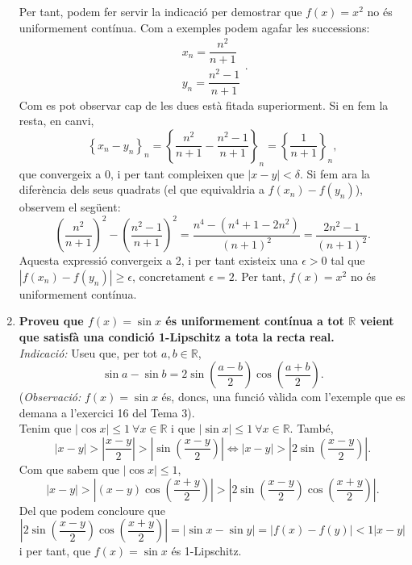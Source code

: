 \documentclass[11pt]{article}
\begin{document}
\begin{enumerate}
$$	$$
	Per tant, podem fer servir la indicació per demostrar que $f(x)=x^2$ no és uniformement contínua. Com a exemples podem agafar les successions:
	$$\begin{array}{lll}
	x_n=\dfrac{n^2}{n+1}\\
	y_n=\dfrac{n^2-1}{n+1}
	\end{array}.
	$$
	Com es pot observar cap de les dues està fitada superiorment. Si en fem la resta, en canvi,
	$$
	\left\{x_n-y_n\right\}_n=\left\{\dfrac{n^2}{n+1}-\dfrac{n^2-1}{n+1}\right\}_n=\left\{\dfrac{1}{n+1}\right\}_n,
	$$
	que convergeix a 0, i per tant compleixen que $|x-y|<\delta$. Si fem ara la diferència dels seus quadrats (el que equivaldria a $f(x_n)-f(y_n)$), observem el següent:
	$$
	\left(\dfrac{n^2}{n+1}\right)^2-\left(\dfrac{n^2-1}{n+1}\right)^2=\dfrac{n^4-(n^4+1-2n^2)}{(n+1)^2}=\dfrac{2n^2-1}{(n+1)^2}.
	$$
	Aquesta expressió convergeix a 2, i per tant existeix una $\epsilon>0$ tal que $|f(x_n)-f(y_n)|\geq\epsilon$, concretament $\epsilon=2$. Per tant, $f(x)=x^2$ no és uniformement contínua.
	\item \textbf{Proveu que $f(x)=\sin x$ és uniformement contínua a tot $\mathbb{R}$ veient que satisfà una condició 1-Lipschitz a tota la recta real.}\\
	\textit{Indicació:} Useu que, per tot $a,b\in\mathbb{R}$,
	$$\sin{a}-\sin{b}=2\sin{\left(\dfrac{a-b}{2}\right)}\cos{\left(\dfrac{a+b}{2}\right)}.$$
	(\textit{Observació:} $f(x)=\sin{x}$ és, doncs, una funció vàlida com l'exemple que es demana a l'exercici 16 del Tema 3).\\
	Tenim que $|\cos{x}|\leq 1\ \forall x\in\mathbb{R}$ i que $|\sin{x}|\leq 1\ \forall x\in\mathbb{R}$. També,
	$$
	|x-y|>\left|\dfrac{x-y}{2}\right|>\left|\sin\left(\dfrac{x-y}{2}\right)\right|\iff |x-y|>\left|2\sin\left(\dfrac{x-y}{2}\right)\right|.
	$$
	Com que sabem que $|\cos{x}|\leq 1$,
	$$
	|x-y|>\left|(x-y)\cos{\left(\dfrac{x+y}{2}\right)}\right|>\left|2\sin{\left(\dfrac{x-y}{2}\right)}\cos{\left(\dfrac{x+y}{2}\right)}\right|.
	$$
	Del que podem concloure que
	$$
	\left|2\sin{\left(\dfrac{x-y}{2}\right)}\cos{\left(\dfrac{x+y}{2}\right)}\right|=|\sin{x}-\sin{y}|=|f(x)-f(y)|<1|x-y|
	$$
	i per tant, que $f(x)=\sin{x}$ és 1-Lipschitz.
\end{enumerate}
\end{document}
